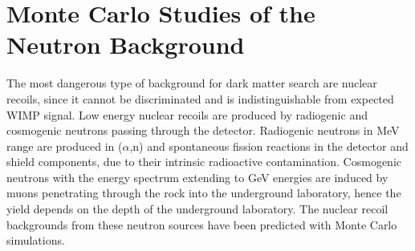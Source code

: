 \chapter{Monte Carlo Studies of the Neutron Background}
\label{chNRbackground}

The most dangerous type of background for dark matter search are nuclear recoils, since it cannot be discriminated and is indistinguishable from expected WIMP signal. Low energy nuclear recoils are produced by radiogenic and cosmogenic neutrons passing through the detector. Radiogenic neutrons in MeV range are produced in ($\alpha$,n) and spontaneous fission reactions in the detector and shield components, due to their intrinsic radioactive contamination. Cosmogenic neutrons with the energy spectrum extending to GeV energies are induced by muons penetrating through the rock into the underground laboratory, hence the yield depends on the depth of the underground laboratory. 
The nuclear recoil backgrounds from these neutron sources have been predicted with Monte Carlo simulations.
